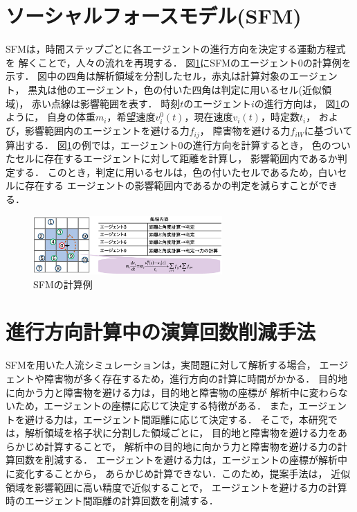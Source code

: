 \documentclass{maelab_y}
\newcommand{\分類条件}{
\begin{table}[t]
\begin{center}
\caption{進行方向を分類する条件}
\ecaption{Classification condition of moving direction $e_{i}$.}
\label{tb:hantei_jouken}
\begin{tabular}{c|c|c|c|c}
\hline \hline
			& 右 & 左 & 上 & 下 \\ \hline
パターン2   & $\frac{1}{\sqrt{2}} < e_x \leq 1  $
		    & $ -1 \leq e_x < \frac{-1}{\sqrt{2}}$ 
		    & $ \frac{-1}{\sqrt{2}} < e_x < \frac{1}{\sqrt{2}} $ 
		    & $ \frac{-1}{2} < e_x < \frac{1}{2} $ \\
パターン3   & $\frac{-1}{2} < e_y < \frac{1}{2} $ 
		    & $\frac{-1}{2} < e_y < \frac{1}{2} $
            & $ \frac{1}{\sqrt{2}} < e_y \leq 1$
		    & $ -1 \leq e_y < \frac{-1}{\sqrt{2}} $ \\
\hline
\multirow{2}{*}{パターン4}   
			& $R_x \geq A_x$ & $R_x < A_x$ & $R_y \geq A_y$ & $R_y < A_y $ \\
	        &  $L_x \geq A_x$ & $L_x < A_x$ & $L_y \geq A_y$ & $L_y < A_y$ \\
\hline
\multirow{2}{*}{パターン5}   
 			& $R_x \geq x_1$ & $R_x < x_2$ & $R_y \geq y_1$ & $R_y < y_2 $ \\
			& $L_x \geq x_1$ & $L_x < x_2$ & $L_y \geq y_1$ & $L_y < y_2 $ \\
\hline
パターン6   & $ \cos(\frac{1}{2}\theta_{view}) \leq  e_y $ 
			& $ e_y \leq -\cos(\frac{1}{2}\theta_{view})$ 
			& $ \sin(\frac{1}{2}(\pi - \theta_{view})) \leq e_x $ 
			& $ e_x \leq \sin(\frac{1}{2}(\pi - \theta_{view}))  $ \\
\hline
\end{tabular}
\end{center}
\end{table}}
\newcommand{\距離計算回数}{
\begin{table}[hbtp]
\begin{center}
\caption{エージェント間距離の計算回数[$10^{10}$回]}
\label{tb:count_result_yobi}
\begin{tabular}{c|r|r|r|r|r|r}
\hline \hline
	人数 & 1 & 2 & 3 & 4 & 5 & 6 \\  
	\hline
	\multirow{2}{*}{3000} 
	& 5.1   & $\mathbf{3.9}$   & 4.0    & 4.4    & 4.1    & 4.4   \\  
	&       & ($\mathbf{24.5}$\%) 					& (22.9\%) & (15.3\%) & (20.7\%) & (15.2\%) \\ \hline
	\multirow{2}{*}{5000} 
	& 14.4  &  $\mathbf{10.9}$  					  & 11.1   & 12.2   & 11.4   & 12.2  \\  
	&       & ($\mathbf{23.8}$\%) 					& (22.6\%) & (15.2\%) & (20.5\%) & (15.1\%) \\ \hline
	\multirow{2}{*}{7500} 
	& 33.1  & $\mathbf{25.2}$	 		    	 	 & 25.8   & 28.3   & 26.7   & 28.3  \\ 
	&       & ($\mathbf{23.9}$\%) 					& (22.2\%) & (14.6\%) & (19.4\%) & (14.6\%) \\ \hline
    \end{tabular}
  \end{center}
\end{table}}
\begin{document}
\section{ソーシャルフォースモデル(SFM)}
SFMは，時間ステップごとに各エージェントの進行方向を決定する運動方程式を
解くことで，人々の流れを再現する．
図\ref{fig:sfm_ex}にSFMのエージェント0の計算例を示す．
図中の四角は解析領域を分割したセル，赤丸は計算対象のエージェント，
黒丸は他のエージェント，色の付いた四角は判定に用いるセル(近似領域)，
赤い点線は影響範囲を表す．
時刻$t$のエージェント$i$の進行方向は，
図\ref{fig:sfm_ex}のように，
自身の体重$m_i$，希望速度$v_i^0(t)$，現在速度$v_i(t)$，時定数$t_i$，
および，影響範囲内のエージェントを避ける力$f_{ij}$，
障害物を避ける力$f_{iW}$に基づいて算出する．
図\ref{fig:sfm_ex}の例では，エージェント0の進行方向を計算するとき，
色のついたセルに存在するエージェントに対して距離を計算し，
影響範囲内であるか判定する．
このとき，判定に用いるセルは，色の付いたセルであるため，白いセルに存在する
エージェントの影響範囲内であるかの判定を減らすことができる．

\begin{figure}[hbtp]
 \begin{center}
  \includegraphics[width=7.21cm,clip]{figure/sfm_ex.eps}
  \caption{SFMの計算例}
  \label{fig:sfm_ex}
 \end{center}
\end{figure}

\section{進行方向計算中の演算回数削減手法}
SFMを用いた人流シミュレーションは，実問題に対して解析する場合，
エージェントや障害物が多く存在するため，進行方向の計算に時間がかかる．
目的地に向かう力と障害物を避ける力は，目的地と障害物の座標が
解析中に変わらないため，エージェントの座標に応じて決定する特徴がある．
また，エージェントを避ける力は，エージェント間距離に応じて決定する．
そこで，本研究では，解析領域を格子状に分割した領域ごとに，
目的地と障害物を避ける力をあらかじめ計算することで，
解析中の目的地に向かう力と障害物を避ける力の計算回数を削減する．
エージェントを避ける力は，エージェントの座標が解析中に変化することから，
あらかじめ計算できない．このため，提案手法は，
近似領域を影響範囲に高い精度で近似することで，
エージェントを避ける力の計算時のエージェント間距離の計算回数を削減する．
\end{document}
